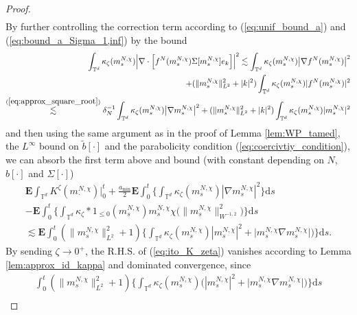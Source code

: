 \begin{proof}
\begin{align*}
 \end{align*}
By further controlling the correction term according to (\ref{eq:unif_bound_a}) and (\ref{eq:bound_a_Sigma_1,inf}) by the bound
\begin{align*}
\int_{\mathbb{T}^d} \kappa_{\zeta}(m_s^{N,\chi})\Big|\nabla \cdot \Big[f^N(m_s^{N,\chi} ) \Sigma[m_s^{N,\chi}] e_k\Big]\Big|^2 \lesssim \int_{\mathbb{T}^d} \kappa_{\zeta}(m_s^{N,\chi})\big|\nabla f^N(m_s^{N,\chi} )\big|^2\\
+ (\|m_s^{N,\chi}\|^2_{L^2} + |k|^2)\int_{\mathbb{T}^d} \kappa_{\zeta}(m_s^{N,\chi}) |f^N(m_s^{N,\chi})|^2\\
\overset{(\ref{eq:approx_square_root})}{\lesssim} \delta_N^{-1}\int_{\mathbb{T}^d} \kappa_{\zeta}(m_s^{N,\chi})\big|\nabla m_s^{N,\chi}\big|^2
+  (\|m_s^{N,\chi}\|^2_{L^2} + |k|^2)\int_{\mathbb{T}^d} \kappa_{\zeta}(m_s^{N,\chi}) |m_s^{N,\chi}|^2
\end{align*}
and then using the same argument as in the proof of Lemma \ref{lem:WP_tamed}, the $L^{\infty}$ bound on $\tilde{b}[\cdot]$ and the parabolicity condition (\ref{eq:coercivtiy_condition}), we can absorb the first term above and bound (with constant depending on $N$, $b[\cdot]$ and $\Sigma[\cdot]$)
\begin{equation}\label{eq:ito_K_zeta}
\begin{split}
    \mathbf{E}\int_{\mathbb{T}^d} K^{\zeta}(m^{N,\chi}_{\cdot})\Big|_0^t 
    +  \frac{a_{\min}}{2}\mathbf{E}\int_0^t\Big\{\int_{\mathbb{T}^d}\kappa_{\zeta}(m_s^{N,\chi}) |\nabla m_s^{N,\chi}|^2\Big\}\mathrm{d}s \\
     - \mathbf{E} \int_0^t\Big\{\int_{\mathbb{T}^d} \kappa_{\zeta}\ast \mathrm{1}_{\leq 0}(m_s^{N,\chi})  m_s^{N,\chi} \chi\big( \|m_s^{N,\chi}\|_{W^{-1,2}}^2\big) \Big\}\mathrm{d}s\\
  \lesssim \mathbf{E} \int_0^t  (\|m_s^{N,\chi}\|_{L^2}^2 + 1)\Big\{\int_{\mathbb{T}^d}  \kappa_{\zeta}(m_s^{N,\chi}) |m_s^{N,\chi}|^2 +\big|m^{N,\chi}_s\nabla m_s^{N,\chi} \big| \big) \Big\} \mathrm{d}s.
\end{split}
\end{equation}
By sending $\zeta \to 0^+$, the R.H.S. of (\ref{eq:ito_K_zeta}) vanishes according to Lemma \ref{lem:approx_id_kappa} and dominated convergence, since 
\begin{align*}
\int_0^t  (\|m_s^{N,\chi}\|_{L^2}^2 + 1)\Big\{\int_{\mathbb{T}^d}  \kappa_{\zeta}(m_s^{N,\chi})\big( |m_s^{N,\chi}|^2 + \big|m^{N,\chi}_s\nabla m_s^{N,\chi} \big|\big) \Big\} \mathrm{d}s \\

\end{align*}
\end{proof}
